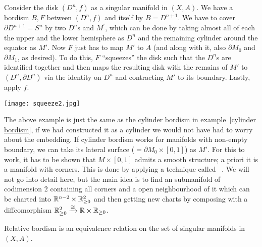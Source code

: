 \documentclass[a4paper,11pt]{article}
\begin{document}
\begin{example}\label{pokeball}
    Consider the disk \((D^n,f)\) as a singular manifold in \((X,A)\). 
    We have a bordism \(B,F\) between \((D^n,f)\) and itself by \(B=D^{n+1}\). We have to cover \(\partial D^{n+1}=S^n\) by two \(D^n\)s and \(M^\prime\), which can be done by taking almost all of each the upper and the lower hemisphere as \(D^n\) 
    and the remaining cylinder around the equator as \(M'\). 
    Now \(F\) just has to map \(M'\) to \(A\) (and along with it, also \(\partial M_0\) and \(\partial M_1\), as desired). 
    To do this, \(F\) \enquote{squeezes} the disk such that the \(D^n\)s are identified together and then maps the resulting disk with the remains of \(M'\) to \((D^n,\partial D^n)\) via the identity on \(D^n\) and contracting \(M'\) to its boundary. Lastly, apply \(f\).
    \begin{center}
        \texttt{[image: squeeze2.jpg]}
    \end{center}
\end{example}

\begin{remark}
    The above example is just the same as the cylinder bordism in example\ \ref{cylinder bordism}, if we had constructed it as a cylinder we would not have had to worry about the embedding. If cylinder bordism works for manifolds with non-empty boundary, we can take its lateral surface (\(=\partial M_0\times [0,1]\)) as \(M'\). For this to work, it has to be shown that \(M\times[0,1]\) admits a smooth structure; a priori it is a manifold with corners. This is done by applying a technique called \ \cite[I.3]{conner}. We will not go into detail here, but the main idea is to find an submanifold of codimension 2 containing all corners and a open neighbourhood of it which can be charted into \(\mathbb{R}^{n-2}\times\mathbb{R}_{\geq0}^2\) and then getting new charts by composing with a diffeomorphism \(\mathbb{R}_{\geq0}^2\xrightarrow\cong\mathbb{R}\times\mathbb{R}_{\geq0}\).
\end{remark}

\begin{theorem}
    Relative bordism is an equivalence relation on the set of singular manifolds in \((X,A)\).
\end{theorem}
\end{document}

